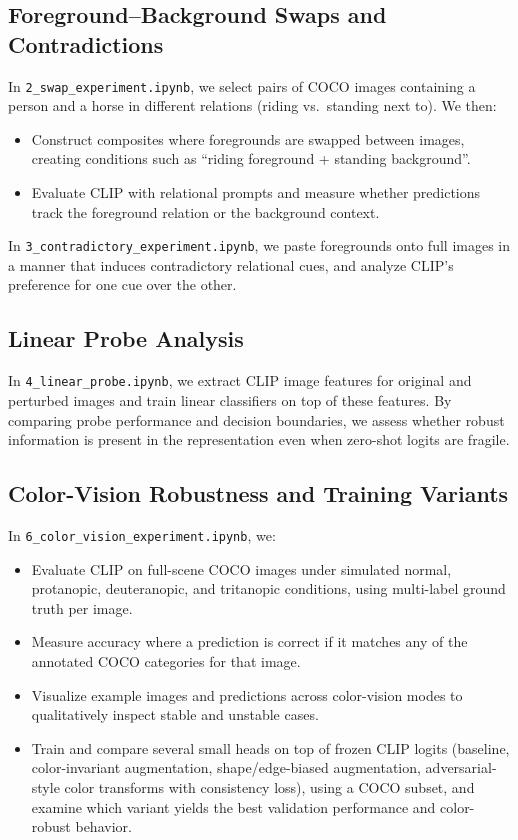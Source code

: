 \documentclass[11pt]{article}
\begin{document}
\subsection{Foreground--Background Swaps and Contradictions}

In \texttt{2\_swap\_experiment.ipynb}, we select pairs of COCO images containing a person and a horse in different relations (riding vs.\ standing next to). We then:
\begin{itemize}
    \item Construct composites where foregrounds are swapped between images, creating conditions such as ``riding foreground + standing background''.
    \item Evaluate CLIP with relational prompts and measure whether predictions track the foreground relation or the background context.
\end{itemize}

In \texttt{3\_contradictory\_experiment.ipynb}, we paste foregrounds onto full images in a manner that induces contradictory relational cues, and analyze CLIP's preference for one cue over the other.

\subsection{Linear Probe Analysis}

In \texttt{4\_linear\_probe.ipynb}, we extract CLIP image features for original and perturbed images and train linear classifiers on top of these features. By comparing probe performance and decision boundaries, we assess whether robust information is present in the representation even when zero-shot logits are fragile.

\subsection{Color-Vision Robustness and Training Variants}

In \texttt{6\_color\_vision\_experiment.ipynb}, we:
\begin{itemize}
    \item Evaluate CLIP on full-scene COCO images under simulated normal, protanopic, deuteranopic, and tritanopic conditions, using multi-label ground truth per image.
    \item Measure accuracy where a prediction is correct if it matches any of the annotated COCO categories for that image.
    \item Visualize example images and predictions across color-vision modes to qualitatively inspect stable and unstable cases.
    \item Train and compare several small heads on top of frozen CLIP logits (baseline, color-invariant augmentation, shape/edge-biased augmentation, adversarial-style color transforms with consistency loss), using a COCO subset, and examine which variant yields the best validation performance and color-robust behavior.
\end{itemize}
\end{document}
